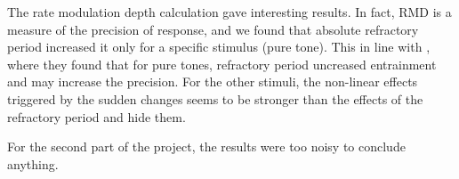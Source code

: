 The rate modulation depth calculation gave interesting results. 
In fact, RMD is a measure of the precision of response,
and we found that absolute refractory period increased it only 
for a specific stimulus (pure tone). 
This in line with \cite{AvissarPapier}, 
where they found that for pure tones, refractory period uncreased entrainment 
and may increase the precision. 
For the other stimuli, the non-linear effects triggered by the sudden changes 
seems to be stronger than the effects of the refractory period and hide them.

For the second part of the project, the results were too noisy to conclude anything.
